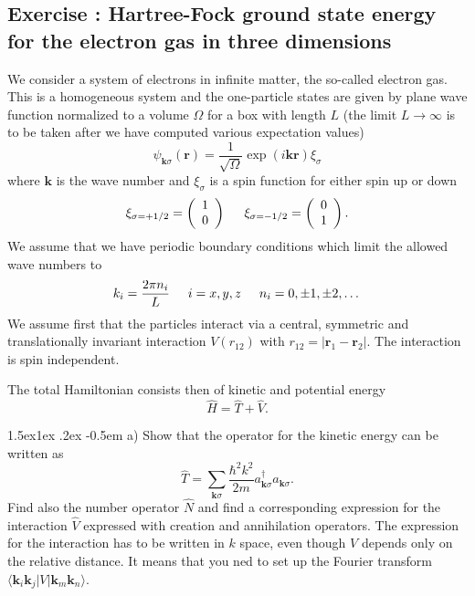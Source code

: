 \documentclass[%
twoside,                 %
final,                   %
10pt]{article}
\makeatletter
\newenvironment{doconceexercise}{}{}
\newcounter{doconceexercisecounter}
\newcommand\subex{\@startsection{paragraph}{4}{\z@}%
                  {1.5ex\@plus1ex \@minus.2ex}%
                  {-0.5em}%
                  {\normalfont\normalsize\bfseries}}
\makeatother
\begin{document}
\begin{doconceexercise}

\subsection*{Exercise \thedoconceexercisecounter: Hartree-Fock ground state energy for the  electron gas in three dimensions}


We consider a system of electrons in infinite matter, the so-called electron gas. This is a homogeneous system and the one-particle states are given by plane wave function normalized to a volume $\Omega$ 
for a box with length $L$ (the limit $L\rightarrow \infty$ is to be taken after we have computed various expectation values)
\[
\psi_{\mathbf{k}\sigma}(\mathbf{r})= \frac{1}{\sqrt{\Omega}}\exp{(i\mathbf{kr})}\xi_{\sigma}
\]
where $\mathbf{k}$ is the wave number and  $\xi_{\sigma}$ is a spin function for either spin up or down
\[ 
\xi_{\sigma=+1/2}=\left(\begin{array}{c} 1 \\ 0 \end{array}\right) \hspace{0.5cm}
\xi_{\sigma=-1/2}=\left(\begin{array}{c} 0 \\ 1 \end{array}\right).
\]
We assume that we have periodic boundary conditions which limit the allowed wave numbers to
\[
k_i=\frac{2\pi n_i}{L}\hspace{0.5cm} i=x,y,z \hspace{0.5cm} n_i=0,\pm 1,\pm 2, \dots
\]
We assume first that the particles interact via a central, symmetric and translationally invariant
interaction  $V(r_{12})$ with
$r_{12}=|\mathbf{r}_1-\mathbf{r}_2|$.  The interaction is spin independent.

The total Hamiltonian consists then of kinetic and potential energy
\[
\hat{H} = \hat{T}+\hat{V}.
\]


\subex{a)}
Show that the operator for the kinetic energy can be written as
\[
\hat{T}=\sum_{\mathbf{k}\sigma}\frac{\hbar^2k^2}{2m}a_{\mathbf{k}\sigma}^{\dagger}a_{\mathbf{k}\sigma}.
\]
Find also the number operator $\hat{N}$ and find a corresponding expression for the interaction
$\hat{V}$ expressed with creation and annihilation operators.   The expression for the interaction
has to be written in  $k$ space, even though $V$ depends only on the relative distance. It means that you ned to set up the Fourier transform $\langle \mathbf{k}_i\mathbf{k}_j| V | \mathbf{k}_m\mathbf{k}_n\rangle$.


\end{doconceexercise}
\end{document}
